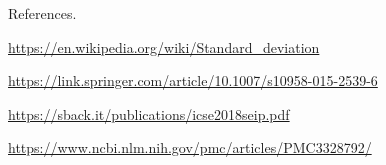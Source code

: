 \documentclass[final]{beamer}
\newlength{\onecolwid}
\begin{document}
\begin{frame}[t]
\begin{columns}[t]
\begin{column}{\onecolwid}


\begin{block}{References.}

\begin{thebibliography}{9}
\url{https://en.wikipedia.org/wiki/Standard_deviation}
 
\url{https://link.springer.com/article/10.1007/s10958-015-2539-6}

 
\url{https://sback.it/publications/icse2018seip.pdf}


\url{https://www.ncbi.nlm.nih.gov/pmc/articles/PMC3328792/}
\end{thebibliography}



\end{block}






\end{column} %

\end{columns} %

\end{frame} %
\end{document}
